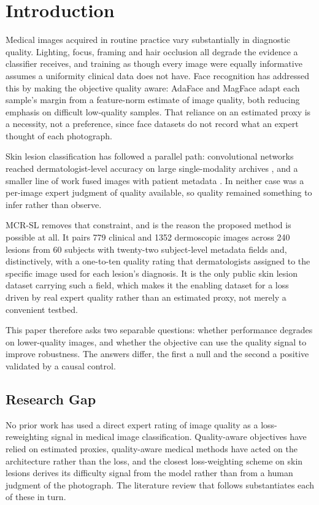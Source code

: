 \documentclass[conference]{IEEEtran}
\begin{document}
\section{Introduction}
Medical images acquired in routine practice vary substantially in diagnostic quality. Lighting, focus, framing and hair occlusion all degrade the evidence a classifier receives, and training as though every image were equally informative assumes a uniformity clinical data does not have. Face recognition has addressed this by making the objective quality aware: AdaFace \cite{adaface} and MagFace \cite{magface} adapt each sample's margin from a feature-norm estimate of image quality, both reducing emphasis on difficult low-quality samples. That reliance on an estimated proxy is a necessity, not a preference, since face datasets do not record what an expert thought of each photograph.

Skin lesion classification has followed a parallel path: convolutional networks reached dermatologist-level accuracy on large single-modality archives \cite{esteva2017,ham10000}, and a smaller line of work fused images with patient metadata \cite{metablock,paduf20}. In neither case was a per-image expert judgment of quality available, so quality remained something to infer rather than observe.

MCR-SL \cite{mcrsl} removes that constraint, and is the reason the proposed method is possible at all. It pairs 779 clinical and 1352 dermoscopic images across 240 lesions from 60 subjects with twenty-two subject-level metadata fields and, distinctively, with a one-to-ten quality rating that dermatologists assigned to the specific image used for each lesion's diagnosis. It is the only public skin lesion dataset carrying such a field, which makes it the enabling dataset for a loss driven by real expert quality rather than an estimated proxy, not merely a convenient testbed.

This paper therefore asks two separable questions: whether performance degrades on lower-quality images, and whether the objective can use the quality signal to improve robustness. The answers differ, the first a null and the second a positive validated by a causal control.

\subsection{Research Gap}
No prior work has used a direct expert rating of image quality as a loss-reweighting signal in medical image classification. Quality-aware objectives have relied on estimated proxies, quality-aware medical methods have acted on the architecture rather than the loss, and the closest loss-weighting scheme on skin lesions derives its difficulty signal from the model rather than from a human judgment of the photograph. The literature review that follows substantiates each of these in turn.
\end{document}
